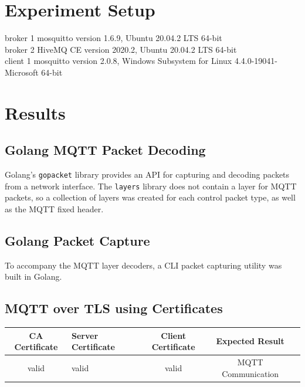 \documentclass[12pt]{article}
\begin{document}
\section*{Experiment Setup}
broker 1 mosquitto version 1.6.9, Ubuntu 20.04.2 LTS 64-bit\\
broker 2 HiveMQ CE version 2020.2, Ubuntu 20.04.2 LTS 64-bit\\
client 1 mosquitto version 2.0.8, Windows Subsystem for Linux 4.4.0-19041-Microsoft 64-bit\\


\section*{Results}
\subsection*{Golang MQTT Packet Decoding}
Golang's \texttt{gopacket} library provides an API for capturing and decoding packets from a network interface. The \texttt{layers} library does not contain a layer for MQTT packets, so a collection of layers was created for each control packet type, as well as the MQTT fixed header.
\subsection*{Golang Packet Capture}
To accompany the MQTT layer decoders, a CLI packet capturing utility was built in Golang. 
\subsection*{MQTT over TLS using Certificates}

\begin{tabular}{  c l c | c c}
\hline
CA Certificate & Server Certificate & Client Certificate & Expected Result\\
\hline
valid & valid & valid & MQTT Communication
\end{tabular}
\end{document}
